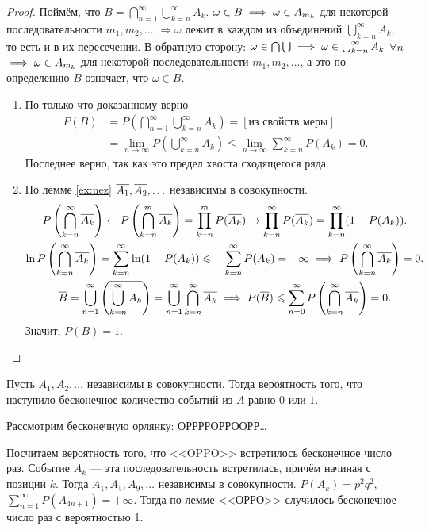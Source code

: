 \begin{proof}
     Поймём, что $B = \bigcap\limits_{n = 1}^\infty \bigcup_{k = n}^\infty A_k$. 
    $\omega \in B \implies \omega \in A_{m_k} $ для некоторой последовательности $m_1,m_2, \ldots$ $\Rightarrow \omega$ лежит в каждом из объединений
    $\bigcup_{k = n}^\infty A_k$, то есть и в их пересечении.
    В обратную сторону:  $\omega \in \bigcap\bigcup \implies \omega\in\bigcup_{k = n}^\infty A_k $ $\forall n$ $\implies \omega\in A_{m_k}$ для
    некоторой последовательности $m_1, m_2, \ldots$, а это по определению $B$ означает, что $\omega\in B$.
   \begin{enumerate}
       \item По только что доказанному верно
       \begin{align*}
           P(B) &= P\left(\bigcap_{n = 1}^\infty \bigcup_{k = n}^\infty A_k\right) = [\text{из свойств меры}]
           \\ &= \underset{n\to \infty}{\lim}
        P\left(\bigcup_{k = n}^\infty A_k\right) \le \underset{n\to\infty}{\lim} \sum_{k = n}^\infty P(A_k) = 0.
       \end{align*}
       Последнее верно, так как это предел хвоста сходящегося ряда.
       \item По лемме \ref{ex:nez} $\overline{A_1}, \overline{A_2}, \ldots$ независимы в совокупности.
       \begin{gather*}
           P\left(\bigcap_{k = n}^\infty \overline{A_k}\right) \leftarrow P\left(\bigcap_{k = n}^m \overline{A_k}\right) = \prod_{k = n}^m P(\overline{A_k}) \rightarrow  \prod_{k = n}^\infty
        P(\overline{A_k}) =  \prod_{k = n}^\infty (1 - P(A_k)).\\
         \ln P\left(\bigcap_{k = n}^\infty \overline{A_k}\right) = \sum_{k = n}^\infty \ln (1 - P(A_k)) \leqslant - \sum_{k = n}^\infty P(A_k)  = -\infty \implies
        P\left(\bigcap_{k = n}^\infty \overline{A_k}\right) = 0.\\
        \overline{B} = \bigcup_{n = 1}^\infty\left(\overline{\bigcup_{k = n}^\infty A_k}\right) = \bigcup_{n = 1}^\infty\bigcap_{k = n}^\infty \overline{A_k}
        \implies P(\overline{B}) \leqslant \sum_{n = 0}^\infty P\left(\bigcap_{k = n}^\infty \overline{A_k}\right) = 0.
       \end{gather*}
        Значит, $P(B) = 1$. \qedhere
   \end{enumerate}
\end{proof}

\begin{corollary} Пусть $A_1, A_2, \ldots$ независимы в совокупности. Тогда вероятность того, что наступило бесконечное количество событий из $A$ равно $0$ или $1$.
\end{corollary}

\begin{example}
    Рассмотрим бесконечную орлянку: ОРРРРОРРООРР\ldots

    Посчитаем вероятность того, что <<OPPO>> встретилось бесконечное число раз. Событие $A_k$ --- эта последовательность встретилась, причём начиная с позиции $k$. Тогда $A_1, A_5, A_9, \ldots$ независимы в совокупности.
    $P(A_k) = p^2q^2$, $\sum_{n = 1}^\infty P(A_{4n+1}) = +\infty$. Тогда по лемме <<ОРРО>> случилось бесконечное число раз с вероятностью 1.
\end{example}\newpage
